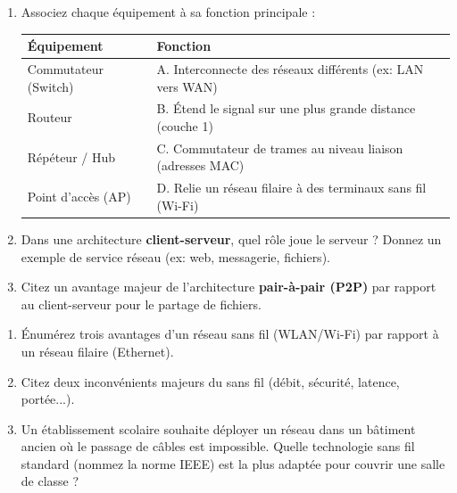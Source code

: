 \documentclass[11pt]{article}
\begin{document}
\begin{exercice}
\begin{enumerate}
    \item Associez chaque équipement à sa fonction principale :
    \begin{tabular}{|l|l|}
    \hline
    \textbf{Équipement} & \textbf{Fonction} \\
    \hline
    Commutateur (Switch) & A. Interconnecte des réseaux différents (ex: LAN vers WAN) \\
    \hline
    Routeur & B. Étend le signal sur une plus grande distance (couche 1) \\
    \hline
    Répéteur / Hub & C. Commutateur de trames au niveau liaison (adresses MAC) \\
    \hline
    Point d'accès (AP) & D. Relie un réseau filaire à des terminaux sans fil (Wi-Fi) \\
    \hline
    \end{tabular}
    \item Dans une architecture \textbf{client-serveur}, quel rôle joue le serveur ? Donnez un exemple de service réseau (ex: web, messagerie, fichiers).
    \item Citez un avantage majeur de l'architecture \textbf{pair-à-pair (P2P)} par rapport au client-serveur pour le partage de fichiers.
\end{enumerate}
\end{exercice}

\begin{exercice}
\begin{enumerate}
    \item Énumérez trois avantages d'un réseau sans fil (WLAN/Wi-Fi) par rapport à un réseau filaire (Ethernet).
    \item Citez deux inconvénients majeurs du sans fil (débit, sécurité, latence, portée...).
    \item Un établissement scolaire souhaite déployer un réseau dans un bâtiment ancien où le passage de câbles est impossible. Quelle technologie sans fil standard (nommez la norme IEEE) est la plus adaptée pour couvrir une salle de classe ?
\end{enumerate}
\end{exercice}
\end{document}
